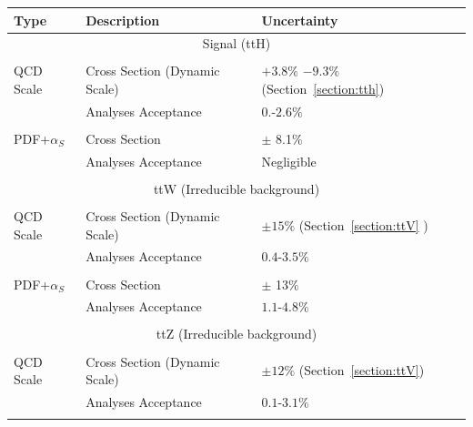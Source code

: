 \begin{table}[htbp]
  \begin{center}
    {\small     
    \begin{tabular}{|lll|}
      \hline
      Type       & Description  &  Uncertainty  \\
     \hline
      \multicolumn{3}{|c|}{Signal (ttH)}\\
     \hline
         &  &                \\
      QCD Scale                    & Cross Section (Dynamic Scale) &    $+3.8\%$  $-9.3\%$   (Section~\ref{section:tth})      \\
                                            & Analyses Acceptance          &    $0.$-$2.6\%$       \\
         & &                \\
      PDF+$\alpha_S$     &   Cross Section  &         $\pm$ 8.1$\%$      \\
                                      &   Analyses Acceptance        &     Negligible       \\
         & &                \\
     \hline
      \multicolumn{3}{|c|}{ttW (Irreducible background)}\\
     \hline
         & &                \\
      QCD Scale                    & Cross Section (Dynamic Scale)  &    $\pm15\%$  (Section~\ref{section:ttV} )       \\
                                            & Analyses Acceptance   &    $0.4$-$3.5\%$        \\
         & &                \\
      PDF+$\alpha_S$     &   Cross Section  &         $\pm$ 13$\%$      \\
                                      &   Analyses Acceptance  &        $1.1$-$4.8\%$      \\
         & &                 \\
     \hline
      \multicolumn{3}{|c|}{ttZ (Irreducible background)}\\
     \hline
         &  &                 \\
      QCD Scale                    & Cross Section (Dynamic Scale)     &    $\pm12\%$     (Section~\ref{section:ttV})\\
                                            & Analyses Acceptance              &    $0.1$-$3.1\%$          \\
         & &                 \\

\end{tabular}}
\end{center}
\end{table}
